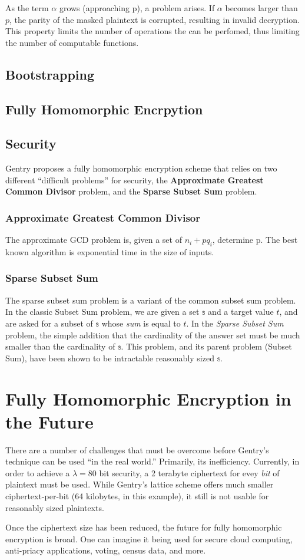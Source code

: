 \documentclass[a4paper,10pt]{article}
\begin{document}
As the term $\alpha$ grows (approaching p), a problem arises. If
$\alpha$ becomes larger than $p$, the parity of the masked plaintext
is corrupted, resulting in invalid decryption. This property limits
the number of operations the can be perfomed, thus limiting the number
of computable functions.

\subsection{Bootstrapping}

\subsection{Fully Homomorphic Encrpytion}

\subsection{Security}
Gentry proposes a fully homomorphic encryption scheme that relies on
two different ``difficult problems'' for security, the
\textbf{Approximate Greatest Common Divisor} problem, and the
\textbf{Sparse Subset Sum} problem.

\subsubsection{Approximate Greatest Common Divisor}
\label{app-gcd}
The approximate GCD problem is, given a set of $ n _{i} + pq_{i} $,
determine p. The best known algorithm is exponential time in the size
of inputs.


\subsubsection{Sparse Subset Sum}
The sparse subset sum problem is a variant of the common subset sum
problem. In the classic Subset Sum problem, we are given a set $
\mathbb{s} $ and a target value $t$, and are asked for a subset of $
\mathbb{s} $ whose \textit{sum} is equal to $t$. In the \textit{Sparse
  Subset Sum} problem, the simple addition that the cardinality of the
answer set must be much smaller than the cardinality of $ \mathbb{s}
$. This problem, and its parent problem (Subset Sum), have been shown
to be intractable reasonably sized $ \mathbb{s} $.

\section{Fully Homomorphic Encryption in the Future}
There are a number of challenges that must be overcome before Gentry's
technique can be used ``in the real world.'' Primarily, its
inefficiency. Currently, in order to achieve a $\lambda = 80$ bit
security, a 2 terabyte ciphertext for evey \textit{bit} of plaintext
must be used. While Gentry's lattice scheme\cite{gentry-lattice}
offers much smaller ciphertext-per-bit (64 kilobytes, in this
example), it still is not usable for reasonably sized plaintexts.

Once the ciphertext size has been reduced, the future for fully
homomorphic encryption is broad. One can imagine it being used for
secure cloud computing, anti-priacy applications, voting, census data,
and more.

\pagebreak

\end{document}
